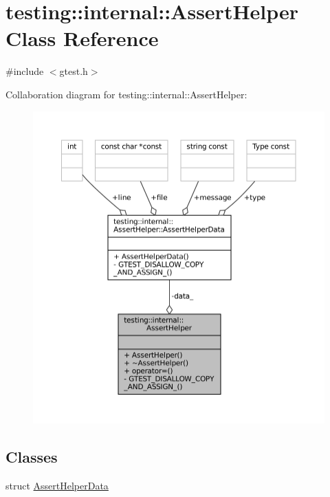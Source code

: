 \hypertarget{classtesting_1_1internal_1_1AssertHelper}{}\section{testing\+:\+:internal\+:\+:Assert\+Helper Class Reference}
\label{classtesting_1_1internal_1_1AssertHelper}


{\ttfamily \#include $<$gtest.\+h$>$}



Collaboration diagram for testing\+:\+:internal\+:\+:Assert\+Helper\+:
\nopagebreak
\begin{figure}[H]
\begin{center}
\leavevmode
\includegraphics[width=350pt]{classtesting_1_1internal_1_1AssertHelper__coll__graph}
\end{center}
\end{figure}
\subsection*{Classes}
\begin{DoxyCompactItemize}
\item 
struct \hyperlink{structtesting_1_1internal_1_1AssertHelper_1_1AssertHelperData}{Assert\+Helper\+Data}
\end{DoxyCompactItemize}
